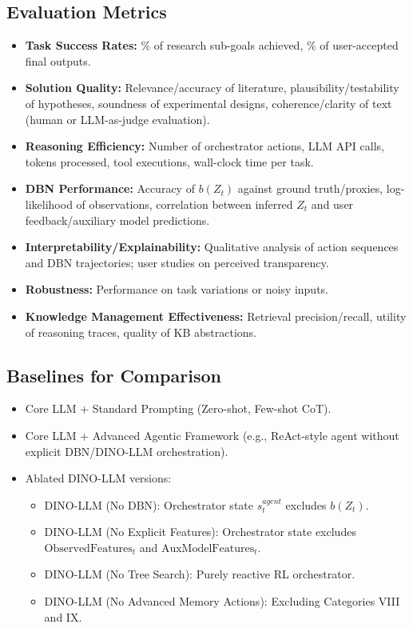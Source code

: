 \documentclass[11pt]{article}
\begin{document}
\subsection{Evaluation Metrics}
\label{ssec:case_study_metrics}
\begin{itemize}
    \item \textbf{Task Success Rates:} \% of research sub-goals achieved, \% of user-accepted final outputs.
    \item \textbf{Solution Quality:} Relevance/accuracy of literature, plausibility/testability of hypotheses, soundness of experimental designs, coherence/clarity of text (human or LLM-as-judge evaluation).
    \item \textbf{Reasoning Efficiency:} Number of orchestrator actions, LLM API calls, tokens processed, tool executions, wall-clock time per task.
    \item \textbf{DBN Performance:} Accuracy of $b(Z_t)$ against ground truth/proxies, log-likelihood of observations, correlation between inferred $Z_t$ and user feedback/auxiliary model predictions.
    \item \textbf{Interpretability/Explainability:} Qualitative analysis of action sequences and DBN trajectories; user studies on perceived transparency.
    \item \textbf{Robustness:} Performance on task variations or noisy inputs.
    \item \textbf{Knowledge Management Effectiveness:} Retrieval precision/recall, utility of reasoning traces, quality of KB abstractions.
\end{itemize}

\subsection{Baselines for Comparison}
\label{ssec:case_study_baselines}
\begin{itemize}
    \item Core LLM + Standard Prompting (Zero-shot, Few-shot CoT).
    \item Core LLM + Advanced Agentic Framework (e.g., ReAct-style agent without explicit DBN/DINO-LLM orchestration).
    \item Ablated DINO-LLM versions:
    \begin{itemize}
        \item DINO-LLM (No DBN): Orchestrator state $s_t^{agent}$ excludes $b(Z_t)$.
        \item DINO-LLM (No Explicit Features): Orchestrator state excludes $\text{ObservedFeatures}_t$ and $\text{AuxModelFeatures}_t$.
        \item DINO-LLM (No Tree Search): Purely reactive RL orchestrator.
        \item DINO-LLM (No Advanced Memory Actions): Excluding Categories VIII and IX.
    \end{itemize}
\end{itemize}
\end{document}
